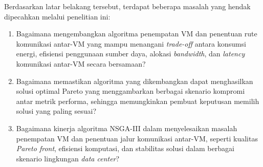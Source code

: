 Berdasarkan latar belakang tersebut, terdapat beberapa masalah yang hendak dipecahkan melalui penelitian ini:

\begin{enumerate}
  \item Bagaimana mengembangkan algoritma penempatan VM dan penentuan rute komunikasi antar-VM yang mampu menangani \textit{trade-off} antara konsumsi energi, efisiensi penggunaan sumber daya, alokasi \textit{bandwidth}, dan \textit{latency} komunikasi antar-VM secara bersamaan?
  \item Bagaimana memastikan algoritma yang dikembangkan dapat menghasilkan solusi optimal Pareto yang menggambarkan berbagai skenario kompromi antar metrik performa, sehingga memungkinkan pembuat keputusan memilih solusi yang paling sesuai?
  \item Bagaimana kinerja algoritma NSGA-III dalam menyelesaikan masalah penempatan VM dan penentuan jalur komunikasi antar-VM, seperti kualitas \textit{Pareto front}, efisiensi komputasi, dan stabilitas solusi dalam berbagai skenario lingkungan \textit{data center}?
\end{enumerate}
